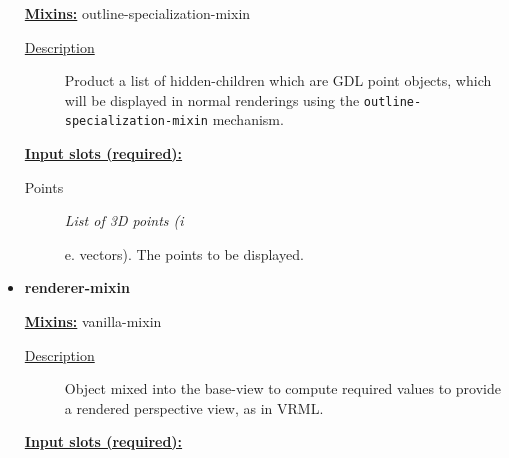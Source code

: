 \documentclass [11pt]{book}
\begin{document}
\begin{itemize}
\textbf{
\underline{Mixins:}} outline-specialization-mixin





\begin{description}

\item [
\underline{Description}]


Product a list of hidden-children which are GDL point objects, which 
will be displayed in normal renderings using the \texttt{outline-specialization-mixin} mechanism.



\end{description}








\textbf{
\underline{Input slots (required):}}

\begin{description}

\item [Points]
\emph{List of 3D points (i}

e. vectors). The points to be displayed.




\end{description}







\item {}
\label{prim:renderer-mixin}
\textbf{renderer-mixin}


\textbf{
\underline{Mixins:}} vanilla-mixin





\begin{description}

\item [
\underline{Description}]


Object mixed into the base-view to compute required values to provide
a rendered perspective view, as in VRML.



\end{description}








\textbf{
\underline{Input slots (required):}}


\end{itemize}
\end{document}

